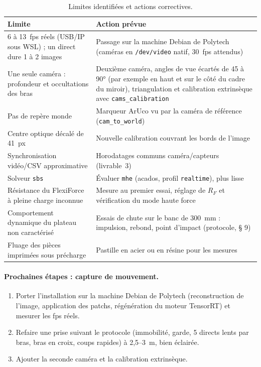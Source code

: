 \documentclass[11pt,a4paper]{article}
\newcommand{\code}[1]{\texttt{\small #1}}
\begin{document}
\begin{table}[H]
\centering
\begin{tabularx}{\textwidth}{@{}XX@{}}
\toprule
\textbf{Limite} & \textbf{Action prévue} \\
\midrule
6 à 13~fps réels (USB/IP sous WSL) ; un direct dure 1 à 2 images & Passage sur la machine Debian de Polytech (caméras en \code{/dev/video} natif, 30~fps attendus) \\
Une seule caméra : profondeur et occultations des bras & Deuxième caméra, angles de vue écartés de 45 à 90° (par exemple en haut et sur le côté du cadre du miroir), triangulation et calibration extrinsèque avec \code{cams\_calibration} \\
Pas de repère monde & Marqueur ArUco vu par la caméra de référence (\code{cam\_to\_world}) \\
Centre optique décalé de 41~px & Nouvelle calibration couvrant les bords de l'image \\
Synchronisation vidéo/CSV approximative & Horodatages communs caméra/capteurs (livrable~3) \\
Solveur \code{sbs} & Évaluer \code{mhe} (acados, profil \code{realtime}), plus lisse \\
Résistance du FlexiForce à pleine charge inconnue & Mesure au premier essai, réglage de $R_F$ et vérification du mode haute force \\
Comportement dynamique du plateau non caractérisé & Essais de chute sur le banc de 300~mm : impulsion, rebond, point d'impact (protocole, § 9) \\
Fluage des pièces imprimées sous précharge & Pastille en acier ou en résine pour les mesures \\
\bottomrule
\end{tabularx}
\caption{Limites identifiées et actions correctives.}
\end{table}

\paragraph{Prochaines étapes : capture de mouvement.}
\begin{enumerate}
  \item Porter l'installation sur la machine Debian de Polytech (reconstruction de l'image, application des patchs, régénération du moteur TensorRT) et mesurer les fps réels.
  \item Refaire une prise suivant le protocole (immobilité, garde, 5 directs lents par bras, bras en croix, coups rapides) à 2,5--3~m, bien éclairée.
  \item Ajouter la seconde caméra et la calibration extrinsèque.
\end{enumerate}
\end{document}
